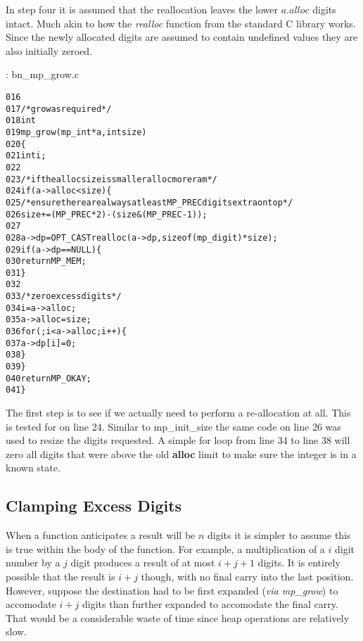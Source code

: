 \documentclass[b5paper]{book}
\begin{document}
In step four it is assumed that the reallocation leaves the lower $a.alloc$ digits intact.  Much akin to how the 
\textit{realloc} function from the standard C library works.  Since the newly allocated digits are assumed to contain
undefined values they are also initially zeroed.

\vspace{+3mm}\begin{small}
\hspace{-5.1mm}{\bf File}: bn\_mp\_grow.c
\vspace{-3mm}
\begin{alltt}
016   
017   /* grow as required */
018   int
019   mp_grow (mp_int * a, int size)
020   \{
021     int     i;
022   
023     /* if the alloc size is smaller alloc more ram */
024     if (a->alloc < size) \{
025       /* ensure there are always at least MP_PREC digits extra on top */
026       size += (MP_PREC * 2) - (size & (MP_PREC - 1));     
027   
028       a->dp = OPT_CAST realloc (a->dp, sizeof (mp_digit) * size);
029       if (a->dp == NULL) \{
030         return MP_MEM;
031       \}
032   
033       /* zero excess digits */
034       i        = a->alloc;
035       a->alloc = size;
036       for (; i < a->alloc; i++) \{
037         a->dp[i] = 0;
038       \}
039     \}
040     return MP_OKAY;
041   \}
\end{alltt}
\end{small}

The first step is to see if we actually need to perform a re-allocation at all.  This is tested for on line 
24.  Similar to mp\_init\_size the same code on line 26 was used to resize the 
digits requested.  A simple for loop from line 34 to line 38 will zero all digits that were above the 
old \textbf{alloc} limit to make sure the integer is in a known state.

\subsection{Clamping Excess Digits}
When a function anticipates a result will be $n$ digits it is simpler to assume this is true within the body of 
the function.  For example, a multiplication of a $i$ digit number by a $j$ digit produces a result of at most 
$i + j + 1$ digits.  It is entirely possible that the result is $i + j$ though, with no final carry into the last 
position.  However, suppose the destination had to be first expanded (\textit{via mp\_grow}) to accomodate $i + j$
digits than further expanded to accomodate the final carry.  That would be a considerable waste of time since heap
operations are relatively slow.
\end{document}
